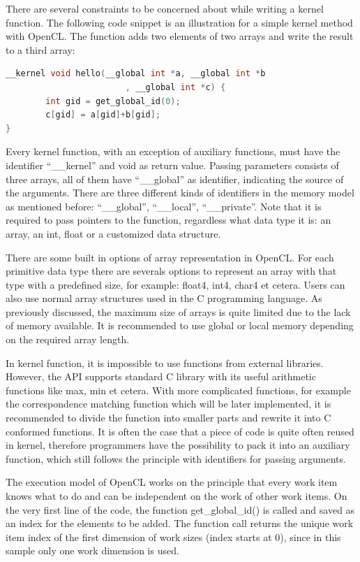 There are several constraints to be concerned about while writing a kernel function. The following code snippet is an illustration for a simple kernel method with OpenCL. The function adds two elements of two arrays and write the result to a third array:
\begin{lstlisting}[language=C]
__kernel void hello(__global int *a, __global int *b
						, __global int *c) {
        int gid = get_global_id(0);
        c[gid] = a[gid]+b[gid];
}

\end{lstlisting}

Every kernel function, with an exception of auxiliary functions, must have the identifier “\_\_kernel” and void as return value. Passing parameters consists of three arrays, all of them have “\_\_global” as identifier, indicating the source of the arguments. There are three different kinds of identifiers in the memory model as mentioned before: “\_\_global”, “\_\_local”, “\_\_private”. Note that it is required to pass pointers to the function, regardless what data type it is: an array, an int, float or a customized data structure.

There are some built in options of array representation in OpenCL. For each primitive data type there are severals options to represent an array with that type with a predefined size, for example: float4, int4, char4 et cetera. Users can also use normal array structures used in the C programming language.  As previously discussed, the maximum size of arrays is quite limited due to the lack of memory available. It is recommended to use global or local memory depending on the required array length. 

In kernel function, it is impossible to use functions from external libraries. However, the API supports standard C library with its useful arithmetic functions like max, min et cetera. With more complicated functions, for example the correspondence matching function which will be later implemented, it is recommended to divide the function into smaller parts and rewrite it into C conformed functions. It is often the case that a piece of code is quite often reused in kernel, therefore programmers have the possibility to pack it into an auxiliary function, which still follows the principle with identifiers for passing arguments.

The execution model of OpenCL works on the principle that every work item knows what to do and can be independent on the work of other work items. On the very first line of the code, the function get\_global\_id() is called and saved as an index for the elements to be added. The function call returns the unique work item index of the first dimension of work sizes (index starts at 0), since in this sample only one work dimension is used.

